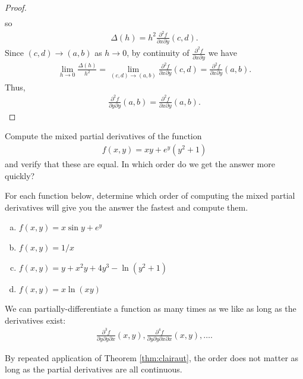 \documentclass[12pt,letterpaper,reqno]{article}
\numberwithin{equation}{section}
\newcommand{\fixme}[1]{{\color{orange}{[#1]}}}
\begin{document}
{\begin{proof}
\begin{align*}
	\end{align*}
	so 
	\begin{align*}
	\Delta(h)=h^2\frac{\partial^2 f}{\partial x \partial y}(c,d).
	\end{align*}
	Since $(c,d) \to (a,b)$ as $h \to 0$, by continuity of $\frac{\partial^2 f}{\partial x \partial y}$ we have
	\begin{align*}
		\lim_{h \to 0}\frac{\Delta(h)}{h^2}=\lim_{(c,d) \to (a,b)}\frac{\partial^2 f}{\partial x \partial y}(c,d)=\frac{\partial^2 f}{\partial x \partial y}(a,b).
	\end{align*}
	Thus,
	\begin{align*}
		\frac{\partial^2 f}{\partial y \partial y}(a,b)=\frac{\partial^2 f}{\partial x \partial y}(a,b).
	\end{align*}
\end{proof}

\begin{exercise}
Compute the mixed partial derivatives of the function
\begin{align*}
	f(x,y)=xy+e^y(y^2+1)
\end{align*}	
and verify that these are equal. In which order do we get the answer more quickly?
\end{exercise}

\begin{exercise}
For each function below, determine which order of computing the mixed partial derivatives will give you the answer the fastest and compute them.
\begin{enumerate}[(a)]
	\item $f(x,y)=x\sin y+e^y$
	\item $f(x,y)=1/x$
	\item $f(x,y)=y+x^2y+4y^3-\ln(y^2+1)$
	\item $f(x,y)=x\ln(xy)$
\end{enumerate}
\end{exercise}
We can partially-differentiate a function as many times as we like as long as the derivatives exist:
\begin{align*}
	\frac{\partial^3 f}{\partial y \partial y \partial x}(x,y), \frac{\partial^4 f}{\partial y \partial y \partial x \partial x}(x,y),\dots.
\end{align*}
\fixme{Add counterexample when they are not continuous.}

By repeated application of Theorem \ref{thm:clairaut}, the order does not matter as long as the partial derivatives are all continuous.


}
\end{document}
